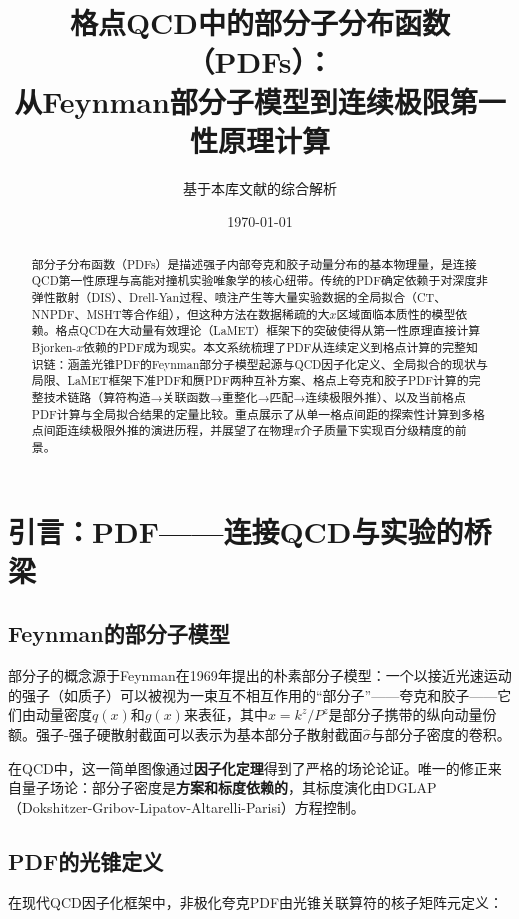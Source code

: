 \documentclass[12pt,a4paper]{ctexart}
\title{\heiti 格点QCD中的部分子分布函数（PDFs）：\\
从Feynman部分子模型到连续极限第一性原理计算}
\author{基于本库文献的综合解析}
\date{\today}
\theoremstyle{definition}
\begin{document}
\maketitle

\begin{abstract}
\noindent
部分子分布函数（PDFs）是描述强子内部夸克和胶子动量分布的基本物理量，是连接QCD第一性原理与高能对撞机实验唯象学的核心纽带。传统的PDF确定依赖于对深度非弹性散射（DIS）、Drell-Yan过程、喷注产生等大量实验数据的全局拟合（CT、NNPDF、MSHT等合作组），但这种方法在数据稀疏的大$x$区域面临本质性的模型依赖。格点QCD在大动量有效理论（LaMET）框架下的突破使得从第一性原理直接计算Bjorken-$x$依赖的PDF成为现实。本文系统梳理了PDF从连续定义到格点计算的完整知识链：涵盖光锥PDF的Feynman部分子模型起源与QCD因子化定义、全局拟合的现状与局限、LaMET框架下准PDF和赝PDF两种互补方案、格点上夸克和胶子PDF计算的完整技术链路（算符构造→关联函数→重整化→匹配→连续极限外推）、以及当前格点PDF计算与全局拟合结果的定量比较。重点展示了从单一格点间距的探索性计算到多格点间距连续极限外推的演进历程，并展望了在物理$\pi$介子质量下实现百分级精度的前景。
\end{abstract}

\tableofcontents
\newpage

\section{引言：PDF——连接QCD与实验的桥梁}

\subsection{Feynman的部分子模型}

部分子的概念源于Feynman在1969年提出的朴素部分子模型\cite{Ji2014LaMET}：一个以接近光速运动的强子（如质子）可以被视为一束互不相互作用的``部分子''——夸克和胶子——它们由动量密度$q(x)$和$g(x)$来表征，其中$x = k^z/P^z$是部分子携带的纵向动量份额。强子-强子硬散射截面可以表示为基本部分子散射截面$\hat{\sigma}$与部分子密度的卷积。

在QCD中，这一简单图像通过\textbf{因子化定理}得到了严格的场论论证\cite{Izubuchi2018}。唯一的修正来自量子场论：部分子密度是\textbf{方案和标度依赖的}，其标度演化由DGLAP（Dokshitzer-Gribov-Lipatov-Altarelli-Parisi）方程控制。

\subsection{PDF的光锥定义}

在现代QCD因子化框架中，非极化夸克PDF由光锥关联算符的核子矩阵元定义\cite{Izubuchi2018,Chen2025gluon}：
\end{document}
